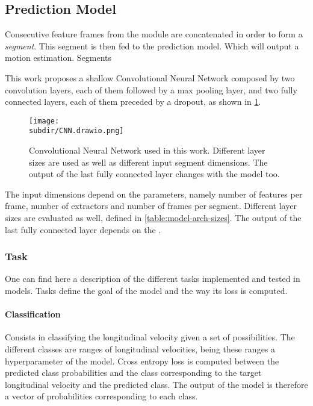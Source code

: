 \subsection{Prediction Model} \label{sec:prediction-model}

Consecutive feature frames from the  module
are concatenated in order to form a \emph{segment}. This segment is then fed to
the prediction model. Which will output a motion estimation. Segments 

This work proposes a shallow Convolutional Neural Network \cite{FukushimaCNN}
composed by two convolution layers, each of them followed by a max pooling
layer, and two fully connected layers, each of them preceded by a dropout, as
shown in \cref{fig:model-arch-cnn}. 

\begin{figure}
    \centering
    \texttt{[image: \\subdir/CNN.drawio.png]}
    \caption{Convolutional Neural Network
         used in this work. Different layer
        sizes are used as well as different input segment dimensions. The
        output of the last fully connected layer changes with the model
         too.}
    \label{fig:model-arch-cnn}
\end{figure}

The input dimensions depend on the 
parameters, namely number of features per frame, number of extractors and
number of frames per segment. Different layer sizes are evaluated as well,
defined in \cref{table:model-arch-sizes}. The output of the last fully
connected layer depends on the .

\subsubsection{Task} \label{subsec:model-task}

One can find here a description of the different tasks implemented and tested
in models. Tasks define the goal of the model and the way its loss is computed.

\paragraph{Classification} \label{para:model-task-class} Consists in
classifying the longitudinal velocity given a set of possibilities. The
different classes are ranges of longitudinal velocities, being these ranges a
hyperparameter of the model. Cross entropy loss is computed between the
predicted class probabilities and the class corresponding to the target
longitudinal velocity and the predicted class. The output of the model is
therefore a vector of probabilities corresponding to each class.

